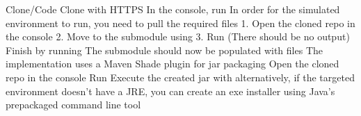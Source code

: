 \markdownRendererDocumentBegin
\markdownRendererSectionBegin
\markdownRendererSectionBegin
{}\markdownRendererInterblockSeparator
{}\markdownRendererSectionBegin
{}\markdownRendererInterblockSeparator
{}\markdownRendererOlBeginTight
{}Clone/Code\markdownRendererOlItemEnd 
{}Clone with HTTPS\markdownRendererOlItemEnd 
{}In the console, run \markdownRendererOlItemEnd 
\markdownRendererOlEndTight \markdownRendererInterblockSeparator
{}
\markdownRendererSectionEnd \markdownRendererSectionBegin
{}\markdownRendererInterblockSeparator
{}In order for the simulated environment to run, you need to pull the required files 1. Open the cloned repo in the console 2. Move to the submodule using\markdownRendererInterblockSeparator
{} 3. Run  (There should be no output)\markdownRendererInterblockSeparator
{}\markdownRendererOlBeginTight
{}Finish by running \markdownRendererOlItemEnd 
{}The  submodule should now be populated with  files\markdownRendererOlItemEnd 
\markdownRendererOlEndTight \markdownRendererInterblockSeparator
{}
\markdownRendererSectionEnd 
\markdownRendererSectionEnd \markdownRendererSectionBegin
{}\markdownRendererInterblockSeparator
{}The implementation uses a Maven Shade plugin for jar packaging\markdownRendererInterblockSeparator
{}\markdownRendererOlBeginTight
{}Open the cloned repo in the console\markdownRendererOlItemEnd 
{}Run \markdownRendererOlItemEnd 
{}Execute the created jar with \markdownRendererInterblockSeparator
{}\markdownRendererUlBeginTight
\markdownRendererUlItem alternatively, if the targeted environment doesn't have a JRE, you can create an exe installer using Java's prepackaged  command line tool\markdownRendererUlItemEnd 
